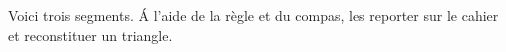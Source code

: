 
\begin{exercice}\label{exosmath-0774}

    Voici trois segments. Á l'aide de la règle et du compas, les reporter sur le cahier et reconstituer un triangle.

\begin{center}
   
\end{center}

\end{exercice}
